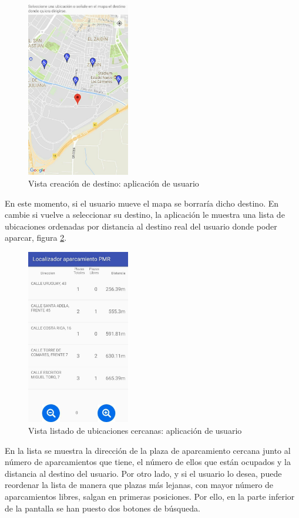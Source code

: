 \begin{figure}[H]
	\centering
	\includegraphics[width=0.4\textwidth]{imagenes/app/4.jpg}
	\caption{Vista creación de destino: aplicación de usuario}
	\label{app_4}
\end{figure}
En este momento, si el usuario mueve el mapa se borraría dicho destino. En cambie si vuelve a seleccionar su destino, la aplicación le muestra una lista de ubicaciones ordenadas por distancia al destino real del usuario donde poder aparcar, figura \ref{app_5}.
\begin{figure}[H]
	\centering
	\includegraphics[width=0.4\textwidth]{imagenes/app/5.jpg}
	\caption{Vista listado de ubicaciones cercanas: aplicación de usuario}
	\label{app_5}
\end{figure}
En la lista se muestra la dirección de la plaza de aparcamiento cercana junto al número de aparcamientos que tiene, el número de ellos que están ocupados y la distancia al destino del usuario. Por otro lado, y si el usuario lo desea, puede reordenar la lista de manera que plazas más lejanas, con mayor número de aparcamientos libres, salgan en primeras posiciones. Por ello, en la parte inferior de la pantalla se han puesto dos botones de búsqueda.
